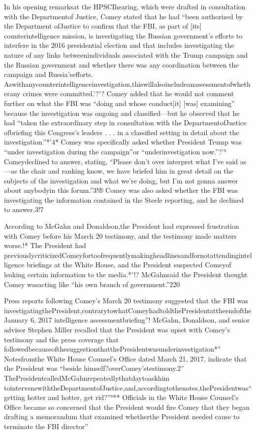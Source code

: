 In his opening remarksat the HPSCIhearing, which were drafted in consultation with the Departmentof Justice, Comey stated that he had “been authorized by the Department ofJustice to confirm that the FBI, as part of [its] counterintelligence mission, is investigating the Russian government’s efforts to interfere in the 2016 presidential election and that includes investigating the nature of any links betweenindividuals associated with the Trump campaign and the Russian government and whether there was any coordination between the campaign and Russia’sefforts.
Aswithanycounterintelligenceinvestigation,thiswillalsoincludeanassessmentofwhetherany crimes were committed.’?'?
Comey added that he would not comment further on what the FBI was “doing and whose conduct[it] [was] examining” because the investigation was ongoing and classified—but he observed that he had “taken the extraordinary step in consultation with the DepartmentofJustice ofbriefing this Congress’s leaders . . . in a classified setting in detail about the investigation.”*'4*
Comey was specifically asked whether President Trump was “under investigation during the campaign”or “underinvestigation now.”?'°
Comeydeclined to answer, stating, “Please don’t over interpret what I’ve said as—as the chair and ranking know, we have briefed him in great detail on the subjects of the investigation and what we’re doing, but I’m not gonna answer about anybodyin this forum.”3!®
Comey was also asked whether the FBI was investigating the information contained in the Steele reporting, and he declined to answer.3!7

According to McGahn and Donaldson,the President had expressed frustration with Comey before his March 20 testimony, and the testimony made matters worse.!*
The President had previouslycriticizedComeyfortoofrequentlymakingheadlinesandfornotattendingintelligence briefings at the White House, and the President suspected Comeyof leaking certain information to the media.*'!?
McGahnsaid the President thought Comey wasacting like “his own branch of government.”220

Press reports following Comey’s March 20 testimony suggested that the FBI was investigatingthePresident,contrarytowhatComeyhadtoldthePresidentattheendoftheJanuary 6, 2017 intelligence assessmentbriefing”!
McGahn, Donaldson, and senior advisor Stephen Miller recalled that the President was upset with Comey’s testimony and the press coverage that followedbecauseofthesuggestionthatthePresidentwasunderinvestigation*”
Notesfromthe White House Counsel’s Office dated March 21, 2017, indicate that the President was “beside himself?overComey’stestimony.2”
ThePresidentcalledMcGahnrepeatedlythatdaytoaskhim tointervenewiththeDepartmentofJustice,and,accordingtothenotes,thePresidentwas“getting hotter and hotter, get rid?”°**
Officials in the White House Counsel’s Office became so concerned that the President would fire Comey that they began drafting a memorandum that examined whetherthe President needed cause to terminate the FBI director”

